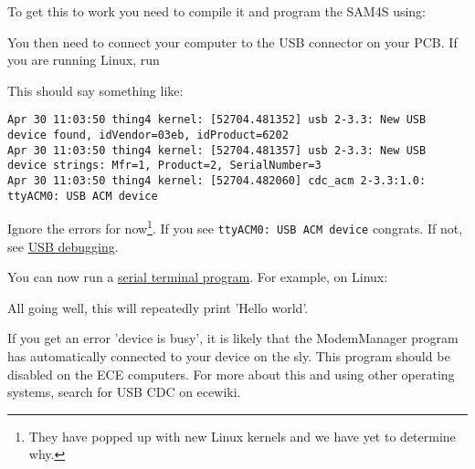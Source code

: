 To get this to work you need to compile it and program the SAM4S using:

\begin{Shaded}
\begin{Highlighting}[]
\NormalTok{$ }
\NormalTok{$ }
\end{Highlighting}
\end{Shaded}

You then need to connect your computer to the USB connector on your PCB.
If you are running Linux, run

\begin{Shaded}
\begin{Highlighting}[]
\NormalTok{$ }
\end{Highlighting}
\end{Shaded}

This should say something like:

\begin{verbatim}
Apr 30 11:03:50 thing4 kernel: [52704.481352] usb 2-3.3: New USB device found, idVendor=03eb, idProduct=6202
Apr 30 11:03:50 thing4 kernel: [52704.481357] usb 2-3.3: New USB device strings: Mfr=1, Product=2, SerialNumber=3
Apr 30 11:03:50 thing4 kernel: [52704.482060] cdc_acm 2-3.3:1.0: ttyACM0: USB ACM device
\end{verbatim}

Ignore the errors for now\footnote{They have popped up with new Linux
  kernels and we have yet to determine why.}. If you see
\texttt{ttyACM0:\ USB\ ACM\ device} congrats. If not, see
\href{USB_debugging}{USB debugging}.

You can now run a \href{Serial_terminal_applications}{serial terminal
program}. For example, on Linux:

\begin{Shaded}
\begin{Highlighting}[]
\end{Highlighting}
\end{Shaded}

All going well, this will repeatedly print 'Hello world'.

If you get an error 'device is busy', it is likely that the ModemManager
program has automatically connected to your device on the sly. This
program should be disabled on the ECE computers. For more about this and
using other operating systems, search for USB CDC on ecewiki.

